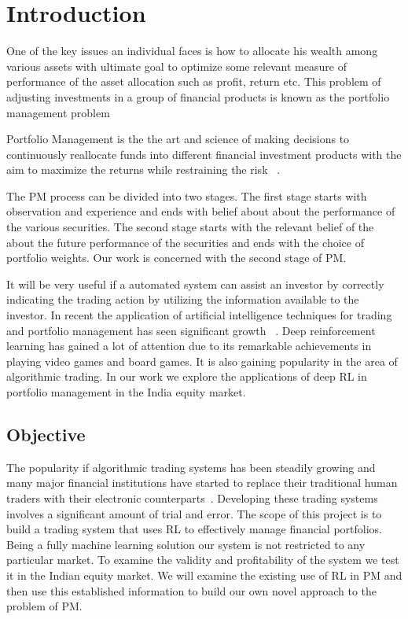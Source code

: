 
\chapter{Introduction}\label{chap:intro}
One of the key issues an individual faces is how to allocate his wealth among various assets with ultimate goal to optimize some relevant measure of performance of the asset allocation such as profit, return etc. This problem of adjusting investments in a group of financial products is known as the portfolio management problem

Portfolio Management is the the art and science of making decisions to continuously reallocate funds into different financial investment products with the aim to maximize the returns while restraining the risk ~\cite{markowitz1952portfolio}. 

The PM process can be divided into two stages. The first stage starts with observation and experience and ends with belief about about the performance of the various securities. The second stage starts with the relevant belief of the about the future performance of the securities and ends with the choice of portfolio weights. Our work is concerned with the second stage of PM. 

It will be very useful if a automated system can assist an investor by correctly indicating the trading action by utilizing the information available to the investor. In recent the application of artificial intelligence techniques for trading and portfolio management has seen significant growth ~\cite{gao2000algorithm}.  Deep reinforcement learning has gained a lot of attention due to its remarkable achievements in playing video games and board games. It is also gaining popularity in the area of algorithmic trading. In our work we explore the applications of deep RL in portfolio management in the India equity market.


\section{Objective}

The popularity if algorithmic trading systems has been steadily growing and many major financial institutions have started to replace their traditional human traders with their electronic counterparts~\cite{cumming2015investigation}. Developing these trading systems involves a significant amount of trial and error. The scope of this project is to build a trading system that uses RL to effectively manage financial portfolios.  Being a fully machine learning solution our system is not restricted to any particular market. To examine the validity and profitability of the system we test it in the Indian equity market. We will examine the existing use of RL in PM and then use this established information to build our own novel approach to the problem of PM.  

